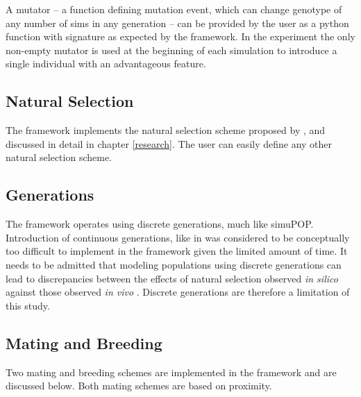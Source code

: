 \documentclass{l4proj}
\begin{document}
A mutator -- a function defining mutation event, which can change genotype of any number of sims in any generation -- can be provided by the user as a python function with signature as expected by the framework. In the experiment the only non-empty mutator is used at the beginning of each simulation to introduce a single individual with an advantageous feature.

\subsection{Natural Selection}

The framework implements the natural selection scheme proposed by \cite{peng10}, and discussed in detail in chapter \ref{research}. The user can easily define any other natural selection scheme.

\subsection{Generations}

The framework operates using discrete generations, much like simuPOP. Introduction of continuous generations, like in \parencite{rohde04} was considered to be conceptually too difficult to implement in the framework given the limited amount of time. It needs to be admitted that modeling populations using discrete generations can lead to discrepancies between the effects of natural selection observed \textit{in silico} against those observed \textit{in vivo} \parencite{Waples14}. Discrete generations are therefore a limitation of this study. 

\subsection{Mating and Breeding}

Two mating and breeding schemes are implemented in the framework and are discussed below. Both mating schemes are based on proximity.
\end{document}
